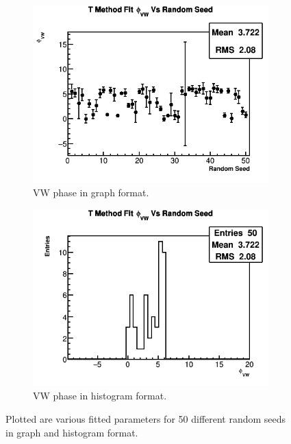 \begin{figure}[]
	   	\vspace{4mm}
	    \begin{subfigure}[t]{0.45\textwidth}
		    \centering
			\includegraphics[width=\textwidth]{TMethod_phi_VW_Vs_Iter_Canv}
		    \caption{VW phase in graph format.}
	    \end{subfigure}
	    \hspace{4mm}
	    \begin{subfigure}[t]{0.45\textwidth}
		    \centering
			\includegraphics[width=\textwidth]{TMethod_phi_VW_Vs_Iter_Canv_hist}
		    \caption{VW phase in histogram format.}
	    \end{subfigure}%
	\caption[TMethodRandomSeedsPars7]{Plotted are various fitted parameters for 50 different random seeds in graph and histogram format.}
	\label{fig:TMethodRandomSeedsPars7}
	\end{figure}


